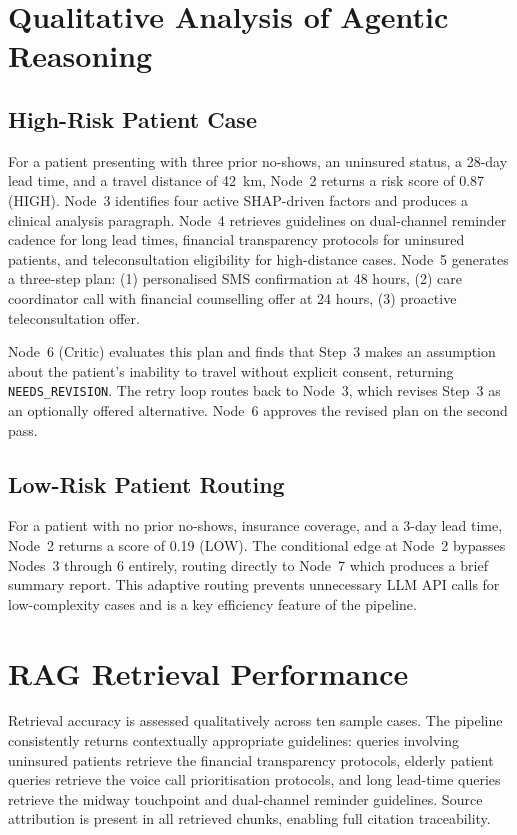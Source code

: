 \documentclass[12pt, a4paper]{report}
\begin{document}
\section{Qualitative Analysis of Agentic Reasoning}

\subsection{High-Risk Patient Case}

For a patient presenting with three prior no-shows, an uninsured status, a 28-day lead time, and a travel distance of 42~km, Node~2 returns a risk score of 0.87 (HIGH). Node~3 identifies four active SHAP-driven factors and produces a clinical analysis paragraph. Node~4 retrieves guidelines on dual-channel reminder cadence for long lead times, financial transparency protocols for uninsured patients, and teleconsultation eligibility for high-distance cases. Node~5 generates a three-step plan: (1) personalised SMS confirmation at 48 hours, (2) care coordinator call with financial counselling offer at 24 hours, (3) proactive teleconsultation offer.

Node~6 (Critic) evaluates this plan and finds that Step~3 makes an assumption about the patient's inability to travel without explicit consent, returning \texttt{NEEDS\_REVISION}. The retry loop routes back to Node~3, which revises Step~3 as an optionally offered alternative. Node~6 approves the revised plan on the second pass.

\subsection{Low-Risk Patient Routing}

For a patient with no prior no-shows, insurance coverage, and a 3-day lead time, Node~2 returns a score of 0.19 (LOW). The conditional edge at Node~2 bypasses Nodes~3 through 6 entirely, routing directly to Node~7 which produces a brief summary report. This adaptive routing prevents unnecessary LLM API calls for low-complexity cases and is a key efficiency feature of the pipeline.

\section{RAG Retrieval Performance}

Retrieval accuracy is assessed qualitatively across ten sample cases. The pipeline consistently returns contextually appropriate guidelines: queries involving uninsured patients retrieve the financial transparency protocols, elderly patient queries retrieve the voice call prioritisation protocols, and long lead-time queries retrieve the midway touchpoint and dual-channel reminder guidelines. Source attribution is present in all retrieved chunks, enabling full citation traceability.
\end{document}
